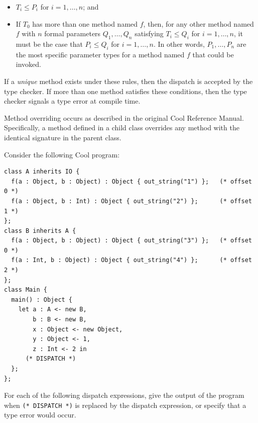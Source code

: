 \documentclass[11pt]{article}
\begin{document}
\begin{enumerate}
\begin{itemize}
\item $T_{i} \leq P_{i}$ for $i = 1, \dots, n$; and

\item If $T_{0}$ has more than one method named $f$, then, for any
other method named $f$ with $n$ formal parameters
$Q_{1}, \dots, Q_{n}$ satisfying $T_{i} \leq Q_{i}$ for
$i = 1, \dots, n$, it must be the case that $P_{i} \leq Q_{i}$ for
$i = 1, \dots, n$.  In other words, $P_{1}, \dots, P_{n}$ are the most
specific parameter types for a method named $f$ that could be invoked.
\end{itemize}

If a {\em unique} method exists under these rules, then the dispatch
is accepted by the type checker.  If more than one method satisfies
these conditions, then the type checker signals a type error at
compile time.

Method overriding occurs as described in the original Cool Reference
Manual.  Specifically, a method defined in a child class overrides any
method with the identical signature in the parent class.

Consider the following Cool program:
\begin{verbatim}
class A inherits IO {
  f(a : Object, b : Object) : Object { out_string("1") };   (* offset 0 *)
  f(a : Object, b : Int) : Object { out_string("2") };      (* offset 1 *)
};
class B inherits A {
  f(a : Object, b : Object) : Object { out_string("3") };   (* offset 0 *)
  f(a : Int, b : Object) : Object { out_string("4") };      (* offset 2 *)
};
class Main {
  main() : Object {
    let a : A <- new B,
        b : B <- new B,
        x : Object <- new Object,
        y : Object <- 1,
        z : Int <- 2 in
      (* DISPATCH *)
  };
};
\end{verbatim}

For each of the following dispatch expressions, give the output of the
program when \texttt{(* DISPATCH *)} is replaced by the dispatch
expression, or specify that a type error would occur.


\end{enumerate}
\end{document}
